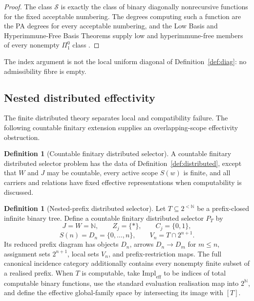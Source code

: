 \documentclass[11pt]{article}
\theoremstyle{plain}
\theoremstyle{definition}
\newtheorem{definition}[theorem]{Definition}
\theoremstyle{remark}
\newcommand{\N}{\mathbb{N}}
\begin{document}
\begin{proof}
The class $\mathcal S$ is exactly the class of binary diagonally nonrecursive
functions for the fixed acceptable numbering. The degrees computing such a
function are the PA degrees for every acceptable numbering, and the Low Basis and Hyperimmune-Free Basis Theorems supply low and hyperimmune-free
members of every nonempty $\Pi^0_1$ class
\cite{jockusch1989,jockuschsoare,rogers}.
\end{proof}

The index argument is not the local uniform diagonal of
Definition~\ref{def:diag}: no admissibility fibre is empty.

\subsection{Nested distributed effectivity}

The finite distributed theory separates local and compatibility failure. The
following countable finitary extension supplies an overlapping-scope
effectivity obstruction.

\begin{definition}[Countable finitary distributed selector]
\label{def:countable-distributed}
A countable finitary distributed selector problem has the data of
Definition~\ref{def:distributed}, except that $W$ and $J$ may be countable,
every active scope $S(w)$ is finite, and all carriers and relations have fixed
effective representations when computability is discussed.
\end{definition}

\begin{definition}[Nested-prefix distributed selector]
\label{def:nested-prefix}
Let $T\subseteq2^{<\N}$ be a prefix-closed infinite binary tree. Define a
countable finitary distributed selector $P_T$ by
\[
J=W=\N,\qquad Z_j=\{\ast\},\qquad C_j=\{0,1\},
\]
\[
S(n)=D_n=\{0,\ldots,n\},
\qquad
V_n=T\cap2^{n+1}.
\]
Its reduced prefix diagram has objects $D_n$, arrows $D_n\to D_m$ for
$m\le n$, assignment sets $2^{n+1}$, local sets $V_n$, and prefix-restriction
maps. The full canonical incidence category additionally contains every
nonempty finite subset of a realised prefix. When $T$ is computable, take
$\mathrm{Impl}_{\mathrm{eff}}$ to be indices of total computable binary
functions, use the standard evaluation realisation map into $2^\N$, and define
the effective global-family space by intersecting its image with $[T]$.
\end{definition}
\end{document}
